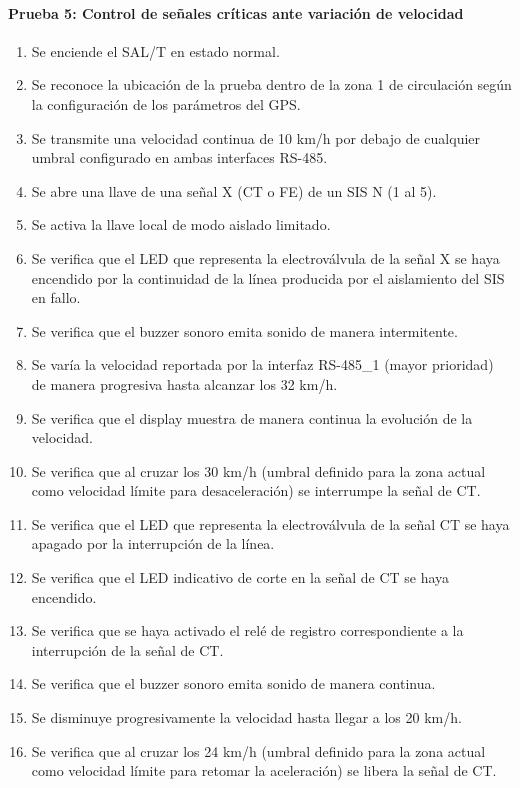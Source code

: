 \paragraph{Prueba 5: Control de señales críticas ante variación de velocidad}
\begin{enumerate}
\item	Se enciende el SAL/T en estado normal.
\item	Se reconoce la ubicación de la prueba dentro de la zona 1 de circulación según la configuración de los parámetros del GPS.
\item	Se transmite una velocidad continua de 10 km/h por debajo de cualquier umbral configurado en ambas interfaces RS-485.
\item	Se abre una llave de una señal X (CT o FE) de un SIS N (1 al 5).
\item	Se activa la llave local de modo aislado limitado.
\item	Se verifica que el LED que representa la electroválvula de la señal X se haya encendido por la continuidad de la línea producida por el aislamiento del SIS en fallo.
\item	Se verifica que el buzzer sonoro emita sonido de manera intermitente.
\item	Se varía la velocidad reportada por la interfaz RS-485\_1 (mayor prioridad) de manera progresiva hasta alcanzar los 32 km/h.
\item	Se verifica que el display muestra de manera continua la evolución de la velocidad.
\item	Se verifica que al cruzar los 30 km/h (umbral definido para la zona actual como velocidad límite para desaceleración) se interrumpe la señal de CT.
\item	Se verifica que el LED que representa la electroválvula de la señal CT se haya apagado por la interrupción de la línea.
\item	Se verifica que el LED indicativo de corte en la señal de CT se haya encendido.
\item	Se verifica que se haya activado el relé de registro correspondiente a la interrupción de la señal de CT.
\item 	Se verifica que el buzzer sonoro emita sonido de manera continua.
\item	Se disminuye progresivamente la velocidad hasta llegar a los 20 km/h.
\item	Se verifica que al cruzar los 24 km/h (umbral definido para la zona actual como velocidad límite para retomar la aceleración) se libera la señal de CT.

\end{enumerate}
